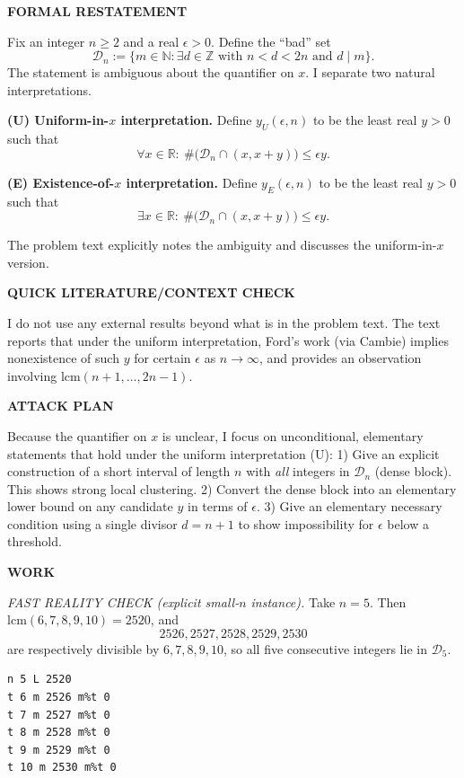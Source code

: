 \medskip
\noindent\textbf{FORMAL RESTATEMENT}

Fix an integer $n\ge 2$ and a real $\epsilon>0$. Define the ``bad'' set
\[
\mathcal D_n := \{m\in\mathbb N : \exists d\in\mathbb Z\text{ with }n<d<2n\text{ and } d\mid m\}.
\]
The statement is ambiguous about the quantifier on $x$.
I separate two natural interpretations.

\noindent\textbf{(U) Uniform-in-$x$ interpretation.}
Define $y_U(\epsilon,n)$ to be the least real $y>0$ such that
\[
\forall x\in\mathbb R:\ \#\bigl(\mathcal D_n\cap (x,x+y)\bigr)\le \epsilon y.
\]

\noindent\textbf{(E) Existence-of-$x$ interpretation.}
Define $y_E(\epsilon,n)$ to be the least real $y>0$ such that
\[
\exists x\in\mathbb R:\ \#\bigl(\mathcal D_n\cap (x,x+y)\bigr)\le \epsilon y.
\]

The problem text explicitly notes the ambiguity and discusses the uniform-in-$x$ version.

\medskip
\noindent\textbf{QUICK LITERATURE/CONTEXT CHECK}

I do not use any external results beyond what is in the problem text. The text reports that under the uniform interpretation, Ford's work (via Cambie) implies nonexistence of such $y$ for certain $\epsilon$ as $n\to\infty$, and provides an observation involving $\mathrm{lcm}(n+1,\dots,2n-1)$.

\medskip
\noindent\textbf{ATTACK PLAN}

Because the quantifier on $x$ is unclear, I focus on unconditional, elementary statements that hold under the uniform interpretation (U):
1) Give an explicit construction of a short interval of length $n$ with \emph{all} integers in $\mathcal D_n$ (dense block). This shows strong local clustering.
2) Convert the dense block into an elementary lower bound on any candidate $y$ in terms of $\epsilon$.
3) Give an elementary necessary condition using a single divisor $d=n+1$ to show impossibility for $\epsilon$ below a threshold.

\medskip
\noindent\textbf{WORK}

\noindent\emph{FAST REALITY CHECK (explicit small-$n$ instance).}
Take $n=5$. Then $\mathrm{lcm}(6,7,8,9,10)=2520$, and
\[2526,2527,2528,2529,2530\]
are respectively divisible by $6,7,8,9,10$, so all five consecutive integers lie in $\mathcal D_5$.
\begin{verbatim}
n 5 L 2520
t 6 m 2526 m%t 0
t 7 m 2527 m%t 0
t 8 m 2528 m%t 0
t 9 m 2529 m%t 0
t 10 m 2530 m%t 0
\end{verbatim}

